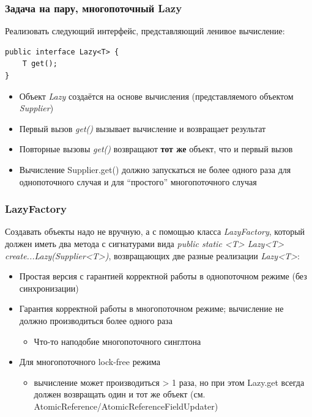 \documentclass[xetex,mathserif,serif]{beamer}
\begin{document}
	\begin{frame}[fragile]
		\frametitle{Задача на пару, многопоточный Lazy}
		Реализовать следующий интерфейс, представляющий ленивое вычисление:
		
		\begin{verbatim}
public interface Lazy<T> {
    T get();
}
		\end{verbatim}

		\begin{itemize}
			\item Объект \textit{Lazy} создаётся на основе вычисления (представляемого объектом \textit{Supplier})
			\item Первый вызов \textit{get()} вызывает вычисление и возвращает результат
			\item Повторные вызовы \textit{get()} возвращают \textbf{тот же} объект, что и первый вызов
			\item Вычисление Supplier.get() должно запускаться не более одного раза для однопоточного случая и для ``простого'' многопоточного случая
		\end{itemize}
	\end{frame}

	\begin{frame}
		\frametitle{LazyFactory}
		Создавать объекты надо не вручную, а с помощью класса \textit{LazyFactory}, который должен
		иметь два метода с сигнатурами вида \textit{public static <T> Lazy<T> 
		create...Lazy(Supplier<T>)}, возвращающих две разные реализации \textit{Lazy<T>}:
		\begin{itemize}
			\item Простая версия с гарантией корректной работы в однопоточном режиме 
				(без синхронизации)
			\item Гарантия корректной работы в многопоточном режиме; вычисление не должно
				производиться более одного раза
			\begin{itemize}
				\item Что-то наподобие многопоточного синглтона
			\end{itemize}
			\item Для многопоточного lock-free режима
			\begin{itemize}
				\item вычисление может производиться > 1 раза, но при этом Lazy.get всегда должен возвращать один и тот же объект (см. AtomicReference/AtomicReferenceFieldUpdater)
			\end{itemize}
		\end{itemize}
	\end{frame}
	
\end{document}
